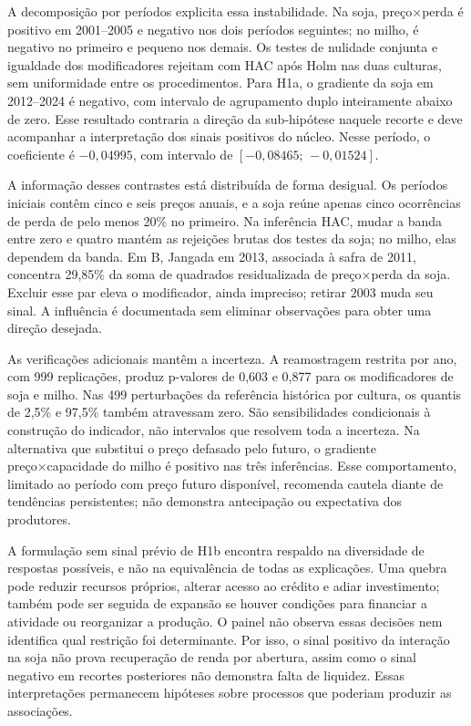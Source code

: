 A decomposição por períodos explicita essa instabilidade. Na soja, preço×perda é positivo em 2001--2005 e negativo nos dois períodos seguintes; no milho, é negativo no primeiro e pequeno nos demais. Os testes de nulidade conjunta e igualdade dos modificadores rejeitam com HAC após Holm nas duas culturas, sem uniformidade entre os procedimentos. Para H1a, o gradiente da soja em 2012--2024 é negativo, com intervalo de agrupamento duplo inteiramente abaixo de zero. Esse resultado contraria a direção da sub-hipótese naquele recorte e deve acompanhar a interpretação dos sinais positivos do núcleo. Nesse período, o coeficiente é $-0,04995$, com intervalo de $[-0,08465;\,-0,01524]$.

A informação desses contrastes está distribuída de forma desigual. Os períodos iniciais contêm cinco e seis preços anuais, e a soja reúne apenas cinco ocorrências de perda de pelo menos 20\% no primeiro. Na inferência HAC, mudar a banda entre zero e quatro mantém as rejeições brutas dos testes da soja; no milho, elas dependem da banda. Em B, Jangada em 2013, associada à safra de 2011, concentra 29,85\% da soma de quadrados residualizada de preço×perda da soja. Excluir esse par eleva o modificador, ainda impreciso; retirar 2003 muda seu sinal. A influência é documentada sem eliminar observações para obter uma direção desejada.

As verificações adicionais mantêm a incerteza. A reamostragem restrita por ano, com 999 replicações, produz p-valores de 0,603 e 0,877 para os modificadores de soja e milho. Nas 499 perturbações da referência histórica por cultura, os quantis de 2,5\% e 97,5\% também atravessam zero. São sensibilidades condicionais à construção do indicador, não intervalos que resolvem toda a incerteza. Na alternativa que substitui o preço defasado pelo futuro, o gradiente preço×capacidade do milho é positivo nas três inferências. Esse comportamento, limitado ao período com preço futuro disponível, recomenda cautela diante de tendências persistentes; não demonstra antecipação ou expectativa dos produtores.

A formulação sem sinal prévio de H1b encontra respaldo na diversidade de respostas possíveis, e não na equivalência de todas as explicações. Uma quebra pode reduzir recursos próprios, alterar acesso ao crédito e adiar investimento; também pode ser seguida de expansão se houver condições para financiar a atividade ou reorganizar a produção. O painel não observa essas decisões nem identifica qual restrição foi determinante. Por isso, o sinal positivo da interação na soja não prova recuperação de renda por abertura, assim como o sinal negativo em recortes posteriores não demonstra falta de liquidez. Essas interpretações permanecem hipóteses sobre processos que poderiam produzir as associações.

